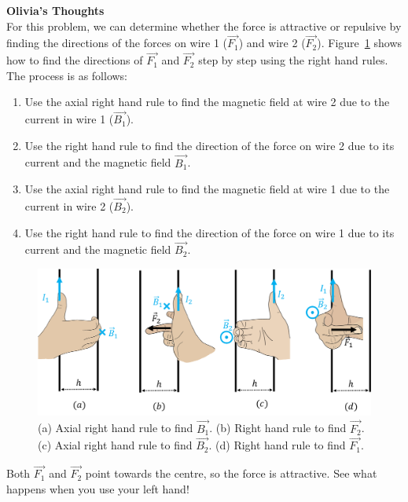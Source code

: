 \begin{framed}
\textbf{Olivia's Thoughts}\\
For this problem, we can determine whether the force is attractive or repulsive by finding the directions of  the forces on wire 1 ($\vec{F_1}$) and wire 2 ($\vec{F_2}$). Figure~\ref{fig:magneticsource:2wires_steps} shows how to find the directions of $\vec{F_1}$ and $\vec{F_2}$ step by step using the right hand rules. The process is as follows:

\begin{enumerate}
\item Use the axial right hand rule to find the magnetic field at wire 2 due to the current in wire 1 ($\vec{B_1}$).
\item Use the right hand rule to find the direction of the force on wire 2 due to its current and the magnetic field $\vec{B_1}$.
\item Use the axial right hand rule to find the magnetic field at wire 1 due to the current in wire 2 ($\vec{B_2}$).
\item Use the right hand rule to find the direction of the force on wire 1 due to its current and the magnetic field $\vec{B_2}$.
\end{enumerate}

\begin{figure}[!htbp]
\centering
\includegraphics[width=0.8\linewidth]{files/2wire_rhr-c435f687470e9436439dd1962c8d6354.png}
\caption[]{(a) Axial right hand rule to find $\vec{B_1}$. (b) Right hand rule to find $\vec{F_2}$. (c) Axial right hand rule to find $\vec{B_2}$. (d) Right hand rule to find $\vec{F_1}$.}
\label{fig:magneticsource:2wires_steps}
\end{figure}

Both $\vec{F_1}$ and $\vec{F_2}$ point towards the centre, so the force is attractive. See what happens when you use your left hand!
\end{framed}

